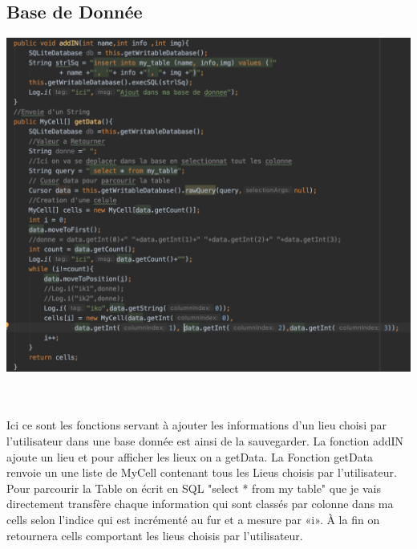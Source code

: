 \documentclass{article}
\begin{document}
\subsection{ \color{olive} Base de Donnée}
\begin{minipage}{0.7\textwidth}
\includegraphics[width=\textwidth]{code4.png}
\end{minipage}
\\
\\
Ici ce sont les fonctions servant à ajouter les informations d’un lieu choisi par l’utilisateur dans une base donnée est ainsi de la sauvegarder.
La fonction addIN ajoute un lieu et pour afficher les lieux on a getData.
La Fonction getData renvoie un une liste de MyCell contenant tous les Lieus choisis par l’utilisateur.
Pour parcourir la Table on écrit en SQL "select * from my table"
que je vais directement transfère chaque information qui sont classés par colonne dans ma cells selon l’indice qui est incrémenté au fur et a mesure par «i».
À la fin on retournera cells comportant les lieus choisis par l’utilisateur.
\end{document}
